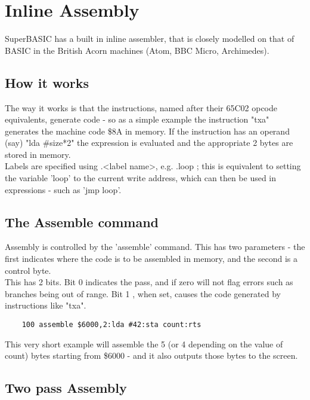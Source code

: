 \chapter{Inline Assembly}

SuperBASIC has a built in inline assembler, that is closely modelled on that of BASIC in the British Acorn machines (Atom, BBC Micro, Archimedes).\\

\section{How it works}

The way it works is that the instructions, named after their 65C02 opcode equivalents, generate code - so as a simple example the instruction "txa" generates the machine code \$8A in memory. If the instruction has an operand (say) "lda \#size*2" the expression is evaluated and the appropriate 2 bytes are stored in memory. \\

Labels are specified using .<label name>, e.g. .loop ; this is equivalent to setting the variable 'loop' to the current write address, which can then be used in expressions - such as 'jmp loop'.

\section {The Assemble command}

Assembly is controlled by the 'assemble' command. This has two parameters - the first indicates where the code is to be assembled in memory, and the second is a control byte. \\

This has 2 bits.  Bit 0 indicates the pass, and if zero will not flag errors such as branches being out of range. Bit 1 , when set, causes the code generated by instructions like "txa".

\begin{verbatim}
	100 assemble $6000,2:lda #42:sta count:rts
\end{verbatim}

This very short example will assemble the 5 (or 4 depending on the value of count) bytes starting from \$6000 - and it also outputs those bytes to the screen. \\

\section {Two pass Assembly}

